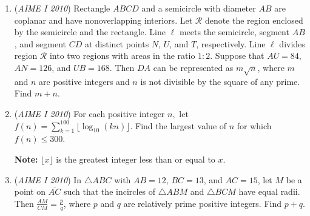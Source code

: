 \begin{enumerate}
 \textbf{Note}: a partition of $S$ is a pair of sets $A$, $B$ such that $A \cap B = \emptyset$, $A \cup B = S$.


 

	\item (\textit{AIME I 2010}) Rectangle $ABCD$ and a semicircle with diameter $AB$ are coplanar and have nonoverlapping interiors. Let $\mathcal{R}$ denote the region enclosed by the semicircle and the rectangle. Line $\ell$ meets the semicircle, segment $AB$, and segment $CD$ at distinct points $N$, $U$, and $T$, respectively. Line $\ell$ divides region $\mathcal{R}$ into two regions with areas in the ratio $1: 2$. Suppose that $AU = 84$, $AN = 126$, and $UB = 168$. Then $DA$ can be represented as $m\sqrt {n}$, where $m$ and $n$ are positive integers and $n$ is not divisible by the square of any prime. Find $m + n$.


 

	\item (\textit{AIME I 2010}) For each positive integer $n,$ let $f(n) = \sum_{k = 1}^{100} \lfloor \log_{10} (kn) \rfloor$. Find the largest value of $n$ for which $f(n) \le 300$.


 \textbf{Note:} $\lfloor x \rfloor$ is the greatest integer less than or equal to $x$.


 

	\item (\textit{AIME I 2010}) In $\triangle{ABC}$ with $AB = 12$, $BC = 13$, and $AC = 15$, let $M$ be a point on $\overline{AC}$ such that the incircles of $\triangle{ABM}$ and $\triangle{BCM}$ have equal radii. Then $\frac{AM}{CM} = \frac{p}{q}$, where $p$ and $q$ are relatively prime positive integers. Find $p + q$.


 

\end{enumerate}